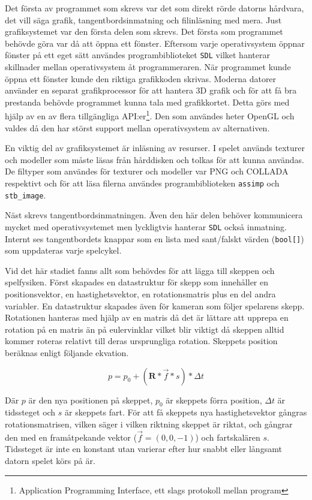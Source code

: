 \documentclass[12pt, a4paper]{article}
\newcommand{\code}{\texttt}
\begin{document}
	Det första av programmet som skrevs var det som direkt rörde datorns hårdvara, det vill säga grafik, tangentbordsinmatning och filinläsning med mera. Just grafiksystemet var den första delen som skrevs. Det första som programmet behövde göra var då att öppna ett fönster. Eftersom varje operativsystem öppnar fönster på ett eget sätt användes programbiblioteket \code{SDL} vilket hanterar skillnader mellan operativsystem åt programmeraren. När programmet kunde öppna ett fönster kunde den riktiga grafikkoden skrivas. Moderna datorer använder en separat grafikprocessor för att hantera 3D grafik och för att få bra prestanda behövde programmet kunna tala med grafikkortet. Detta görs med hjälp av en av flera tillgängliga API:er\footnote{Application Programming Interface, ett slags protokoll mellan program}. Den som användes heter OpenGL och valdes då den har störst support mellan operativsystem av alternativen. 
	
	En viktig del av grafiksystemet är inläsning av resurser. I spelet används texturer och modeller som måste läsas från hårddisken och tolkas för att kunna användas. De filtyper som användes för texturer och modeller var PNG och COLLADA respektivt och för att läsa filerna användes programbiblioteken \code{assimp} och \code{stb\_image}. 
	
	Näst skrevs tangentbordsinmatningen. Även den här delen behöver kommunicera mycket med operativsystemet men lyckligtvis hanterar \code{SDL} också inmatning. Internt ses tangentbordets knappar som en lista med sant/falskt värden (\code{bool[]}) som uppdateras varje spelcykel. 
	
	Vid det här stadiet fanns allt som behövdes för att lägga till skeppen och spelfysiken. Först skapades en datastruktur för skepp som innehåller en positionsvektor, en hastighetsvektor, en rotationsmatris plus en del andra variabler. En datastruktur skapades även för kameran som följer spelarens skepp. Rotationen hanteras med hjälp av en matris då det är lättare att upprepa en rotation på en matris än på eulervinklar vilket blir viktigt då skeppen alltid kommer roteras relativt till deras ursprungliga rotation. Skeppets position beräknas enligt följande ekvation. 
	
	\begin{equation}
		p = p_0 + (\textbf{R} * \vec{f} * s) * \Delta t
	\end{equation}
	
	Där $p$ är den nya positionen på skeppet, $p_0$ är skeppets förra position, $\Delta t$ är tidssteget och $s$ är skeppets fart. För att få skeppets nya hastighetsvektor gångras rotationsmatrisen, vilken säger i vilken riktning skeppet är riktat, och gångrar den med en framåtpekande vektor ($\vec{f} = (0, 0, -1)$) och fartskalären $s$. Tidssteget är inte en konstant utan varierar efter hur snabbt eller långsamt datorn spelet körs på är. 
	
\end{document}
